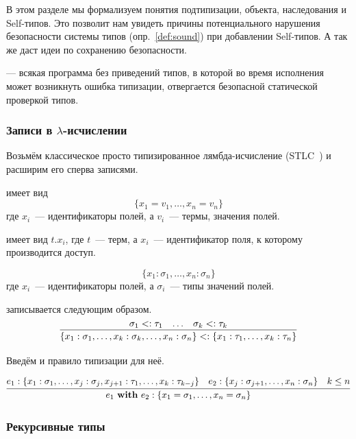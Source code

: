 В этом разделе мы формализуем понятия подтипизации, объекта, наследования и Self-типов.
Это позволит нам увидеть причины потенциального нарушения безопасности системы типов (опр.~\ref{def:sound}) при добавлении Self-типов.
А так же даст идеи по сохранению безопасности.

\begin{definition}
    \label{def:sound}
     --- всякая программа без приведений типов, в которой во время исполнения может возникнуть ошибка типизации, отвергается безопасной статической проверкой типов.
\end{definition}

\subsubsection{Записи в $\lambda$-исчислении} \label{subsubsec:records}

Возьмём классическое просто типизированное лямбда-исчисление (STLC~\cite{pierce2002types}) и расширим его сперва записями.

 имеет вид \[\{x_1 = v_1,\ldots,x_n = v_n\}\] где $x_i$~--- идентификаторы полей, а $v_i$~--- термы, значения полей.

 имеет вид $t.x_i$, где $t$~--- терм, а $x_i$~--- идентификатор поля, к которому производится доступ.

 \[\{x_1 : \sigma_1,\ldots,x_n : \sigma_n\}\] где $x_i$~--- идентификаторы полей, а $\sigma_i$~--- типы значений полей.

 записывается следующим образом.
\[
    \infer{
        \{x_1 : \sigma_1, \ldots, x_k : \sigma_k, \ldots, x_n : \sigma_n\}
        <:
        \{x_1 : \tau_1, \ldots, x_k : \tau_n\}
    }{\sigma_1 <: \tau_1 & \ldots & \sigma_k <: \tau_k}
\]

Введём  и правило типизации для неё.

\[
    \infer{
        e_1 ~\mathbf{with}~ e_2 : \{x_1 = \sigma_1, \ldots, x_n = \sigma_n\}
    }{
        e_1 : \{x_1 : \sigma_1, \ldots, x_j : \sigma_j, x_{j + 1} : \tau_{1}, \ldots, x_k : \tau_{k - j}\}
        &
        e_2 : \{x_j : \sigma_{j + 1}, \ldots, x_n : \sigma_n\}
        &
        k \le n
    }
\]

\subsubsection{Рекурсивные типы} \label{subsubsec:recursive-types}

